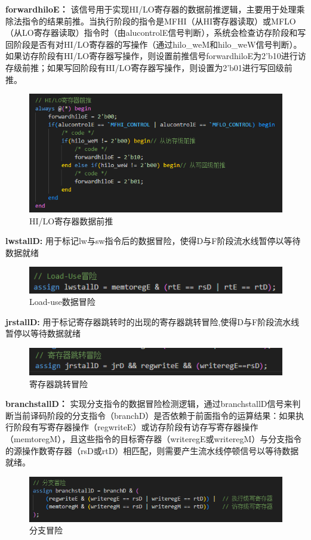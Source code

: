 \textbf{forwardhiloE：}
该信号用于实现HI/LO寄存器的数据前推逻辑，主要用于处理乘除法指令的结果前推。当执行阶段的指令是MFHI（从HI寄存器读取）或MFLO（从LO寄存器读取）指令时（由alucontrolE信号判断），系统会检查访存阶段和写回阶段是否有对HI/LO寄存器的写操作（通过hilo\_weM和hilo\_weW信号判断）。如果访存阶段有HI/LO寄存器写操作，则设置前推信号forwardhiloE为2'b10进行访存级前推；如果写回阶段有HI/LO寄存器写操作，则设置为2'b01进行写回级前推。
\begin{figure}[h]
\centering
\includegraphics[width=1\linewidth]{image/hazard4.png}
\caption{HI/LO寄存器数据前推}
\label{fig:enter-label}
\end{figure}

\newpage
\textbf{lwstallD:}
用于标记lw与sw指令后的数据冒险，使得D与F阶段流水线暂停以等待数据就绪
\begin{figure}[h]
\centering
\includegraphics[width=1\linewidth]{image/hazard5.png}
\caption{Load-use数据冒险}
\label{fig:enter-label}
\end{figure}

\textbf{jrstallD:}
用于标记寄存器跳转时的出现的寄存器跳转冒险,使得D与F阶段流水线暂停以等待数据就绪
\begin{figure}[h]
\centering
\includegraphics[width=1\linewidth]{image/hazard6.png}
\caption{寄存器跳转冒险}
\label{fig:enter-label}
\end{figure}

\textbf{branchstallD：}
实现分支指令的数据冒险检测逻辑，通过branchstallD信号来判断当前译码阶段的分支指令（branchD）是否依赖于前面指令的运算结果：如果执行阶段有写寄存器操作（regwriteE）或访存阶段有访存写寄存器操作（memtoregM），且这些指令的目标寄存器（writeregE或writeregM）与分支指令的源操作数寄存器（rsD或rtD）相匹配，则需要产生流水线停顿信号以等待数据就绪。
\begin{figure}[h]
\centering
\includegraphics[width=1\linewidth]{image/hazard10.png}
\caption{分支冒险}
\label{fig:enter-label}
\end{figure}

